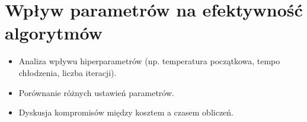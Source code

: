 \section{Wpływ parametrów na efektywność algorytmów}
\begin{itemize}
    \item Analiza wpływu hiperparametrów (np. temperatura początkowa, tempo chłodzenia, liczba iteracji).
    \item Porównanie różnych ustawień parametrów.
    \item Dyskusja kompromisów między kosztem a czasem obliczeń.
\end{itemize}
